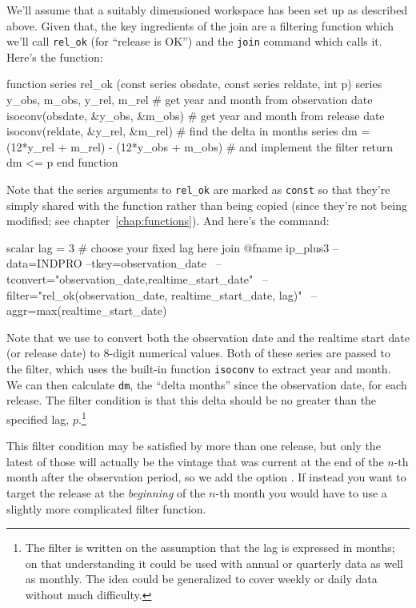 We'll assume that a suitably dimensioned workspace has been set up as
described above. Given that, the key ingredients of the join are a
filtering function which we'll call \verb|rel_ok| (for ``release is
OK'') and the \texttt{join} command which calls it. Here's the
function:
%
\begin{code}
function series rel_ok (const series obsdate, const series reldate, int p)
  series y_obs, m_obs, y_rel, m_rel
  # get year and month from observation date
  isoconv(obsdate, &y_obs, &m_obs)
  # get year and month from release date
  isoconv(reldate, &y_rel, &m_rel)
  # find the delta in months
  series dm = (12*y_rel + m_rel) - (12*y_obs + m_obs)
  # and implement the filter
  return dm <= p
end function
\end{code}
%
Note that the series arguments to \verb|rel_ok| are marked as
\texttt{const} so that they're simply shared with the function rather
than being copied (since they're not being modified; see
chapter~\ref{chap:functions}). And here's the command:
%
\begin{code}
scalar lag = 3  # choose your fixed lag here
join @fname ip_plus3 --data=INDPRO --tkey=observation_date \
--tconvert="observation_date,realtime_start_date" \
--filter="rel_ok(observation_date, realtime_start_date, lag)" \
--aggr=max(realtime_start_date)
\end{code}

Note that we use  to convert both the observation
date and the realtime start date (or release date) to 8-digit
numerical values. Both of these series are passed to the filter, which
uses the built-in function \texttt{isoconv} to extract year and month.
We can then calculate \texttt{dm}, the ``delta months'' since the
observation date, for each release.  The filter condition is that this
delta should be no greater than the specified lag, $p$.\footnote{The
  filter is written on the assumption that the lag is expressed in
  months; on that understanding it could be used with annual or
  quarterly data as well as monthly. The idea could be generalized to
  cover weekly or daily data without much difficulty.}

This filter condition may be satisfied by more than one release, but
only the latest of those will actually be the vintage that was current
at the end of the $n$-th month after the observation period, so we add
the option \option{aggr=max(realtime\_start\_date)}.  If instead you
want to target the release at the \emph{beginning} of the $n$-th month
you would have to use a slightly more complicated filter function.

